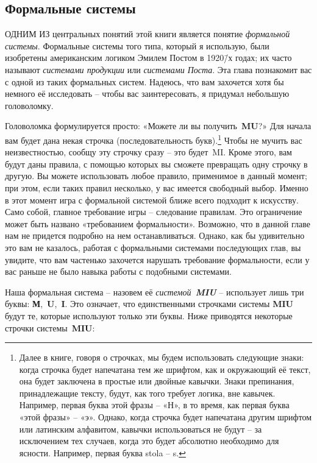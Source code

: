 \documentclass[../main.tex]{subfiles}
\begin{document}

\subsection{Формальные системы}

ОДНИМ ИЗ центральных понятий этой книги является понятие \emph{формальной системы}. Формальные системы того типа, который я использую, были изобретены американским логиком Эмилем Постом в 1920\=/х годах; их часто называют \emph{системами продукции} или \emph{системами Поста}. Эта глава познакомит вас с одной из таких формальных систем. Надеюсь, что вам захочется хотя бы немного её исследовать \--- чтобы вас заинтересовать, я придумал небольшую головоломку.

Головоломка формулируется просто: «Можете ли вы получить~\textbf{MU}?» Для начала вам будет дана некая строчка (последовательность букв).\footnote{Далее в книге, говоря о строчках, мы будем использовать следующие знаки: когда строчка будет напечатана тем же шрифтом, как и окружающий её текст, она будет заключена в простые или двойные кавычки. Знаки препинания, принадлежащие тексту, будут, как того требует логика, вне кавычек. Например, первая буква этой фразы \--- «Н», в то время, как первая буква «этой фразы» \--- «э». Однако, когда строчка будет напечатана другим шрифтом или латинским алфавитом, кавычки использоваться не будут \--- за исключением тех случаев, когда это будет абсолютно необходимо для ясности. Например, первая буква stola \--- s.} Чтобы не мучить вас неизвестностью, сообщу эту строчку сразу \--- это будет~MI\@. Кроме этого, вам будут даны правила, с помощью которых вы сможете превращать одну строчку в другую. Вы можете использовать любое правило, применимое в данный момент; при этом, если таких правил несколько, у вас имеется свободный выбор. Именно в этот момент игра с формальной системой ближе всего подходит к искусству. Само собой, главное требование игры \--- следование правилам. Это ограничение может быть названо «требованием формальности». Возможно, что в данной главе нам не придется подробно на нем останавливаться. Однако, как бы удивительно это вам не казалось, работая с формальными системами последующих глав, вы увидите, что вам частенько захочется нарушать требование формальности, если у вас раньше не было навыка работы с подобными системами.

Наша формальная система \--- назовем её \emph{системой~\textbf{MIU}} \--- использует лишь три буквы: \textbf{М},~\textbf{U},~\textbf{I}\@. Это означает, что единственными строчками системы \textbf{MIU} будут те, которые используют только эти буквы. Ниже приводятся некоторые строчки системы~\textbf{MIU}:
\end{document}
